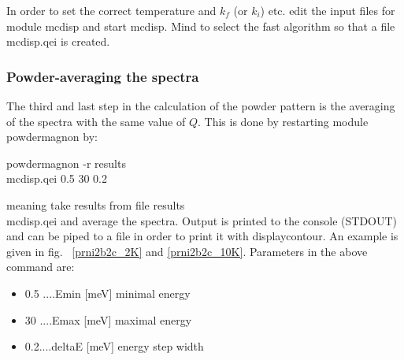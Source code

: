 In order to set the correct temperature and $k_f$ (or $k_i$) etc. edit
the input files for module {\prg mcdisp} and start {\prg mcdisp}. Mind 
to select the fast algorithm so that a file {\prg mcdisp.qei} is created.

\subsubsection{Powder-averaging the spectra}
The third and last step in the calculation of the powder pattern is the averaging
of the spectra with the same value of $Q$. This is done by restarting module
{\prg powdermagnon} by: 

powdermagnon -r results\\mcdisp.qei 0.5 30 0.2 

meaning take  results from file {\prg results\\mcdisp.qei} and average the
spectra. Output is printed to the console (STDOUT) and can be piped to a file in
order to print it with {\prg displaycontour}. An example is given in fig.~
\ref{prni2b2c_2K} and \ref{prni2b2c_10K}.
Parameters in the above command  are:
\begin{itemize}
\item 0.5 ....Emin   [meV] minimal energy
\item 30 ....Emax   [meV] maximal energy
\item 0.2....deltaE [meV] energy step width
\end{itemize}
